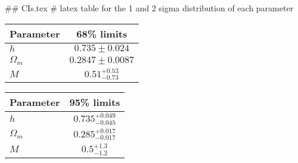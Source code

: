 ## CIs.tex
# latex table for the 1 and 2 sigma distribution of each parameter

\begin{tabular} { l  c}
 Parameter &  68\% limits\\
\hline
{\boldmath$h              $} & $0.735\pm 0.024            $\\
{\boldmath$\Omega_m       $} & $0.2847\pm 0.0087          $\\
{\boldmath$M              $} & $0.51^{+0.53}_{-0.73}      $\\
\hline
\end{tabular}

\begin{tabular} { l  c}
 Parameter &  95\% limits\\
\hline
{\boldmath$h              $} & $0.735^{+0.049}_{-0.045}   $\\
{\boldmath$\Omega_m       $} & $0.285^{+0.017}_{-0.017}   $\\
{\boldmath$M              $} & $0.5^{+1.3}_{-1.2}         $\\
\hline
\end{tabular}
